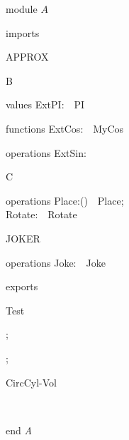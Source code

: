 {\small\sf module} $A$
\begin{interface}{imports}
\begin{from}{APPROX}
\end{from}
\begin{from}{B}
\begin{modulesignature}{values}
ExtPI:\Real \ \ PI
\end{modulesignature}
\begin{modulesignature}{functions}
ExtCos:\Real  \To \Real \ \ MyCos
\end{modulesignature}
\begin{modulesignature}{operations}
ExtSin:\Real  \Oto \Real 
\end{modulesignature}
\end{from}
\begin{from}{C}
\begin{modulesignature}{operations}
Place:\Int  \X \Int  \Oto ()\ \ Place; \\
Rotate:\Lp \Int  \X \Int  \Rp  \X \Real  \Oto \Int  \X \Int \ \ Rotate
\end{modulesignature}
\end{from}
\begin{from}{JOKER}
\begin{modulesignature}{operations}
Joke:\Real  \X \Real  \Oto \Real \ \ Joke
\end{modulesignature}
\end{from}
\end{interface}
\begin{interface}{exports}
\end{interface}
\kDefinitions
\kOperations
\begin{op}[e]{Test}%
\signature{() \Oto \seqof*{\Opt{\Real  | \Lp \Int  \X \Int  \Rp }}}
\parms{}
\begin{blockstmt}
 ; \\
\end{blockstmt};
\end{op}
\begin{op}[e]{CircCyl-Vol}%
\signature{\Real  \X \Real  \X \Real  \Oto \Real }
\begin{letstmt}
\end{letstmt} \\
\end{op}
{\small\sf end} {\it A}


